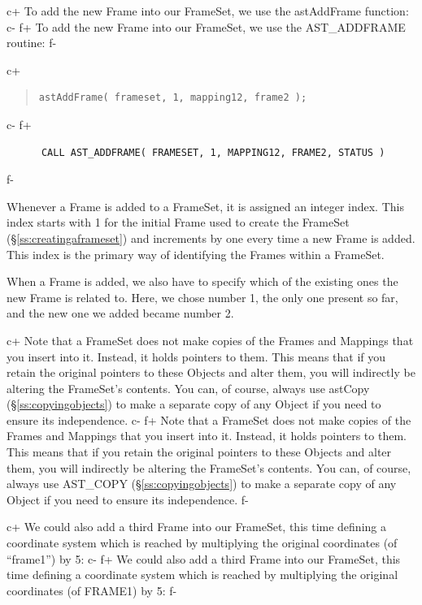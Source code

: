 \documentclass[twoside,11pt]{article}
\newcommand{\secref}[1]{\S\ref{#1}}
\newcommand{\secref}[1]{\ref{#1}}
\begin{document}
c+
To add the new Frame into our FrameSet, we use the astAddFrame
function:
c-
f+
To add the new Frame into our FrameSet, we use the AST\_ADDFRAME
routine:
f-

c+
\begin{quote}
\small
\begin{verbatim}
astAddFrame( frameset, 1, mapping12, frame2 );
\end{verbatim}
\normalsize
\end{quote}
c-
f+
\small
\begin{verbatim}
      CALL AST_ADDFRAME( FRAMESET, 1, MAPPING12, FRAME2, STATUS )
\end{verbatim}
\normalsize
f-

Whenever a Frame is added to a FrameSet, it is assigned an integer
index. This index starts with 1 for the initial Frame used to create
the FrameSet (\secref{ss:creatingaframeset}) and increments by one
every time a new Frame is added. This index is the primary way of
identifying the Frames within a FrameSet.

When a Frame is added, we also have to specify which of the existing
ones the new Frame is related to. Here, we chose number 1, the only
one present so far, and the new one we added became number 2.

c+
Note that a FrameSet does not make copies of the Frames and Mappings
that you insert into it. Instead, it holds pointers to them. This
means that if you retain the original pointers to these Objects and
alter them, you will indirectly be altering the FrameSet's
contents. You can, of course, always use astCopy
(\secref{ss:copyingobjects}) to make a separate copy of any Object if
you need to ensure its independence.
c-
f+
Note that a FrameSet does not make copies of the Frames and Mappings
that you insert into it. Instead, it holds pointers to them. This
means that if you retain the original pointers to these Objects and
alter them, you will indirectly be altering the FrameSet's
contents. You can, of course, always use AST\_COPY
(\secref{ss:copyingobjects}) to make a separate copy of any Object if
you need to ensure its independence.
f-

c+
We could also add a third Frame into our FrameSet, this time defining
a coordinate system which is reached by multiplying the original
coordinates (of ``frame1'') by 5:
c-
f+
We could also add a third Frame into our FrameSet, this time defining
a coordinate system which is reached by multiplying the original
coordinates (of FRAME1) by 5:
f-
\end{document}

